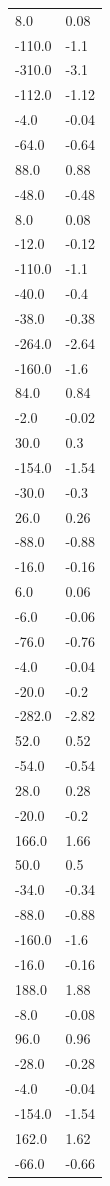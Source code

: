 \begin{longtable}{ll}
8.0 & 0.08 \\
-110.0 & -1.1 \\
-310.0 & -3.1 \\
-112.0 & -1.12 \\
-4.0 & -0.04 \\
-64.0 & -0.64 \\
88.0 & 0.88 \\
-48.0 & -0.48 \\
8.0 & 0.08 \\
-12.0 & -0.12 \\
-110.0 & -1.1 \\
-40.0 & -0.4 \\
-38.0 & -0.38 \\
-264.0 & -2.64 \\
-160.0 & -1.6 \\
84.0 & 0.84 \\
-2.0 & -0.02 \\
30.0 & 0.3 \\
-154.0 & -1.54 \\
-30.0 & -0.3 \\
26.0 & 0.26 \\
-88.0 & -0.88 \\
-16.0 & -0.16 \\
6.0 & 0.06 \\
-6.0 & -0.06 \\
-76.0 & -0.76 \\
-4.0 & -0.04 \\
-20.0 & -0.2 \\
-282.0 & -2.82 \\
52.0 & 0.52 \\
-54.0 & -0.54 \\
28.0 & 0.28 \\
-20.0 & -0.2 \\
166.0 & 1.66 \\
50.0 & 0.5 \\
-34.0 & -0.34 \\
-88.0 & -0.88 \\
-160.0 & -1.6 \\
-16.0 & -0.16 \\
188.0 & 1.88 \\
-8.0 & -0.08 \\
96.0 & 0.96 \\
-28.0 & -0.28 \\
-4.0 & -0.04 \\
-154.0 & -1.54 \\
162.0 & 1.62 \\
-66.0 & -0.66 \\

\end{longtable}
